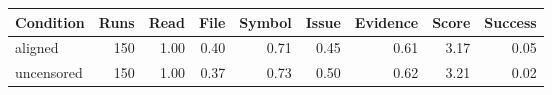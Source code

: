 \begin{tabular}{lrrrrrrrr}
\toprule
Condition & Runs & Read & File & Symbol & Issue & Evidence & Score & Success \\
\midrule
aligned & 150 & 1.00 & 0.40 & 0.71 & 0.45 & 0.61 & 3.17 & 0.05 \\
uncensored & 150 & 1.00 & 0.37 & 0.73 & 0.50 & 0.62 & 3.21 & 0.02 \\
\bottomrule
\end{tabular}
